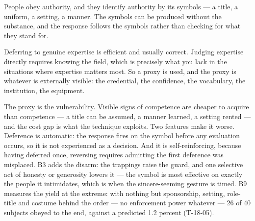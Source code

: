 


\begin{core}
People obey authority, and they identify authority by its symbols --- a title, a uniform, a setting, a manner. The symbols can be produced without the substance, and the response follows the symbols rather than checking for what they stand for.
\end{core}

\begin{mechanism}
Deferring to genuine expertise is efficient and usually correct. Judging expertise directly requires knowing the field, which is precisely what you lack in the situations where expertise matters most. So a proxy is used, and the proxy is whatever is externally visible: the credential, the confidence, the vocabulary, the institution, the equipment.

The proxy is the vulnerability. Visible signs of competence are cheaper to acquire than competence --- a title can be assumed, a manner learned, a setting rented --- and the cost gap is what the technique exploits. Two features make it worse. Deference is automatic: the response fires on the symbol before any evaluation occurs, so it is not experienced as a decision. And it is self-reinforcing, because having deferred once, reversing requires admitting the first deference was misplaced. B3 adds the disarm: the trappings raise the guard, and one selective act of honesty or generosity lowers it --- the symbol is most effective on exactly the people it intimidates, which is when the sincere-seeming gesture is timed.
B9 measures the yield at the extreme: with nothing but sponsorship, setting, role-title and costume behind the order --- no enforcement power whatever --- 26 of 40 subjects obeyed to the end, against a predicted 1.2 percent (T-18-05).
\end{mechanism}

